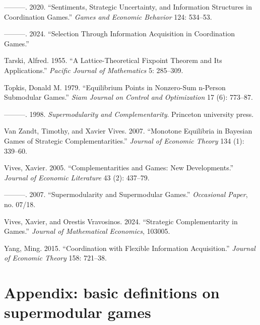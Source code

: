\documentclass[
]{article}
\newlength{\cslhangindent}
\newenvironment{CSLReferences}[2] %
 {\begin{list}{}{%
  \setlength{\itemindent}{0pt}
  \setlength{\leftmargin}{0pt}
  \setlength{\parsep}{0pt}
  \ifodd #1
   \setlength{\leftmargin}{\cslhangindent}
   \setlength{\itemindent}{-1\cslhangindent}
  \fi
  \setlength{\itemsep}{#2\baselineskip}}}
 {\end{list}}
\theoremstyle{definition}
\theoremstyle{plain}
\theoremstyle{remark}
\begin{document}
\begin{CSLReferences}{1}{0}
---------. 2020. {``Sentiments, Strategic Uncertainty, and Information
Structures in Coordination Games.''} \emph{Games and Economic Behavior}
124: 534--53.

---------. 2024. {``Selection Through Information Acquisition in
Coordination Games.''}

Tarski, Alfred. 1955. {``A Lattice-Theoretical Fixpoint Theorem and Its
Applications.''} \emph{Pacific Journal of Mathematics} 5: 285--309.

Topkis, Donald M. 1979. {``Equilibrium Points in Nonzero-Sum n-Person
Submodular Games.''} \emph{Siam Journal on Control and Optimization} 17
(6): 773--87.

---------. 1998. \emph{Supermodularity and Complementarity}. Princeton
university press.

Van Zandt, Timothy, and Xavier Vives. 2007. {``Monotone Equilibria in
Bayesian Games of Strategic Complementarities.''} \emph{Journal of
Economic Theory} 134 (1): 339--60.

Vives, Xavier. 2005. {``Complementarities and Games: New
Developments.''} \emph{Journal of Economic Literature} 43 (2): 437--79.

---------. 2007. {``Supermodularity and Supermodular Games.''}
\emph{Occasional Paper}, no. 07/18.

Vives, Xavier, and Orestis Vravosinos. 2024. {``Strategic
Complementarity in Games.''} \emph{Journal of Mathematical Economics},
103005.

Yang, Ming. 2015. {``Coordination with Flexible Information
Acquisition.''} \emph{Journal of Economic Theory} 158: 721--38.

\end{CSLReferences}

\newpage

\section*{Appendix: basic definitions on supermodular
games}\label{appendix-basic-definitions-on-supermodular-games}
\end{document}
